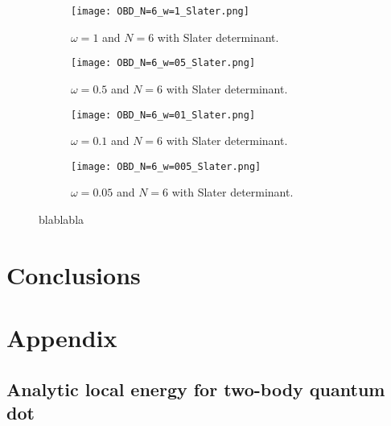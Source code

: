 \documentclass[english, a4paper]{article}
\begin{document}
\begin{figure}[H]
\begin{center}
\begin{subfigure}{.4\textwidth}
  \centering
  \texttt{[image: OBD\_N=6\_w=1\_Slater.png]}
  \caption{$\omega = 1$ and $N = 6$ with Slater determinant.}
  \label{fig:NAVN1}
\end{subfigure}
\begin{subfigure}{.4\textwidth}
  \centering
  \texttt{[image: OBD\_N=6\_w=05\_Slater.png]}
  \caption{$\omega = 0.5$ and $N = 6$ with Slater determinant.}
  \label{fig:NAVN2}
\end{subfigure}
\vspace{1cm}
\begin{subfigure}{.4\textwidth}
  \centering
  \texttt{[image: OBD\_N=6\_w=01\_Slater.png]}
  \caption{$\omega = 0.1$ and $N = 6$ with Slater determinant.}
  \label{fig:NAVN3}
\end{subfigure}
   \begin{subfigure}{.4\textwidth}
  \centering
  \texttt{[image: OBD\_N=6\_w=005\_Slater.png]}
  \caption{$\omega = 0.05$ and $N = 6$ with Slater determinant.}
  \label{fig:NAVN4}
\end{subfigure}
\vspace{1cm}
    \label{WithoutSlater}
  \end{center}
  \caption{blablabla}
\end{figure}


\section{Conclusions}
 



\newpage 
\appendix
\section{Appendix}
\subsection{Analytic local energy for two-body quantum dot} \label{app:appendixA1}
\end{document}
